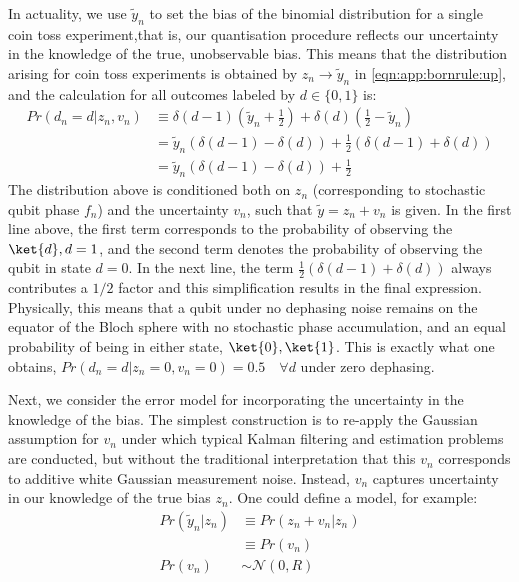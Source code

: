 In actuality, we use $\tilde{y}_n$ to set the bias of the binomial distribution for a single coin toss experiment,that is, our quantisation procedure reflects our uncertainty in the knowledge of the true, unobservable bias. This means that the distribution arising for coin toss experiments is obtained by $z_n \to \tilde{y}_n$ in \cref{eqn:app:bornrule:up}, and the calculation for all outcomes labeled by $ d\in \{0, 1\}$ is:
\begin{align}
Pr(d_n=d | z_n, v_n) &\equiv  \delta(d-1) (\tilde{y}_n + \frac{1}{2})  +  \delta(d) ( \frac{1}{2} - \tilde{y}_n) \\
& =  \tilde{y}_n \left( \delta(d-1) - \delta(d) \right)  + \frac{1}{2}\left(\delta(d-1) + \delta(d) \right) \\
& = \tilde{y}_n \left( \delta(d-1) - \delta(d) \right)  + \frac{1}{2}
\end{align}
The distribution above is conditioned both on $z_n$ (corresponding to stochastic qubit phase $f_n$) and the uncertainty $v_n$, such that $\tilde{y} = z_n + v_n$ is given.  In the first line above, the first term corresponds to the probability of observing the $\ket{d}, d=1$, and the second term denotes the probability of observing the qubit in state $d=0$. In the next line, the term $\frac{1}{2}\left(\delta(d-1) + \delta(d) \right)$ always contributes a $1/2$ factor and this simplification results in the final expression. Physically, this means that a qubit under no dephasing noise remains on the equator of the Bloch sphere with no stochastic phase accumulation, and an equal probability of being in either state, $\ket{0}, \ket{1}$. This is exactly what one obtains, $Pr(d_n=d | z_n=0, v_n=0) = 0.5 \quad \forall d$ under zero dephasing. 

Next, we consider the error model for incorporating the uncertainty in the knowledge of the bias. The simplest construction is to re-apply the Gaussian assumption for $v_n$ under which typical Kalman filtering and estimation problems are conducted, but without the traditional interpretation that this $v_n$ corresponds to additive white Gaussian measurement noise. Instead, $v_n$ captures uncertainty in our knowledge of the true bias $z_n$. One could define a model, for example:
\begin{align}
Pr( \tilde{y}_n | z_n) & \equiv Pr( z_n + v_n | z_n) \\
& \equiv Pr(v_n) \\
Pr(v_n)  & \sim \mathcal{N}(0, R)
\end{align}


